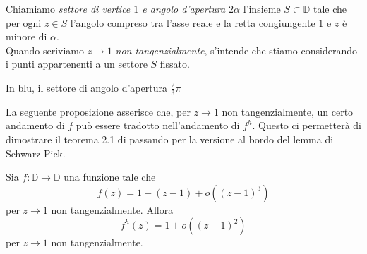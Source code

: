 \begin{defn}
  Chiamiamo \textit{settore di vertice $1$ e angolo d'apertura $2\alpha$} l'insieme $S \subset \mathbb{D}$ tale che per ogni $z \in S$ l'angolo compreso tra l'asse reale e la retta congiungente $1$ e $z$ è minore di $\alpha$. \\
  Quando scriviamo $z \longrightarrow 1$ \textit{non tangenzialmente}, s'intende che stiamo considerando i punti appartenenti a un settore $S$ fissato.
  \begin{center}

    In blu, il settore di angolo d'apertura $\frac{2}{3}\pi$
  \end{center}
\end{defn}

La seguente proposizione asserisce che, per $z \longrightarrow 1$ non tangenzialmente, un certo andamento di $f$ può essere tradotto nell'andamento di $f^h$. Questo ci permetterà di dimostrare il teorema 2.1 di \cite{BK} passando per la versione al bordo del lemma di Schwarz-Pick.

\begin{prop} \label{o^3->o^2}
  Sia $f:\mathbb{D} \longrightarrow \mathbb{D}$ una funzione tale che
  \begin{equation} \label{o^3}
    f(z)=1+(z-1)+o((z-1)^3)
  \end{equation}
  per $z \longrightarrow 1$ non tangenzialmente. Allora
  \begin{equation} \label{o^2}
    f^h(z)=1+o((z-1)^2)
  \end{equation}
  per $z \longrightarrow 1$ non tangenzialmente.
\end{prop}


